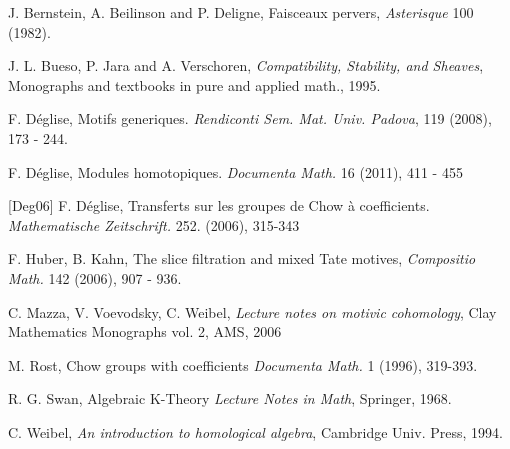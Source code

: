 
\begin{thebibliography}{10}

J. Bernstein, A. Beilinson and P. Deligne,
Faisceaux pervers, {\em Asterisque} 100 (1982).

J. L. Bueso, P. Jara and A. Verschoren,
{\em Compatibility, Stability, and Sheaves}, 
Monographs and textbooks in pure and applied math.,
1995.

F. D\'eglise, Motifs generiques.
{\em Rendiconti Sem. Mat. Univ. Padova},
119 (2008), 173 - 244.

F. D\'eglise, 
Modules homotopiques.
{\em Documenta Math.}
16 (2011), 411 - 455

[Deg06]
F. D\'eglise,
Transferts sur les groupes de Chow \`a coefficients.
{\em Mathematische Zeitschrift.} 252. (2006), 315-343

F. Huber, B. Kahn, The slice filtration and mixed Tate motives,
{\em Compositio Math.} 142 (2006), 907 - 936.

C. Mazza, V. Voevodsky, C. Weibel,
{\em Lecture notes on motivic cohomology},
Clay Mathematics Monographs vol. 2,
AMS, 2006

M. Rost, 
Chow groups with coefficients
{\em Documenta Math.} 
1 (1996), 319-393. 

R. G. Swan,
Algebraic K-Theory
{\em Lecture Notes in Math},
Springer, 1968.

C. Weibel,
{\em An introduction to homological algebra},
Cambridge Univ. Press, 1994.

\end{thebibliography}
